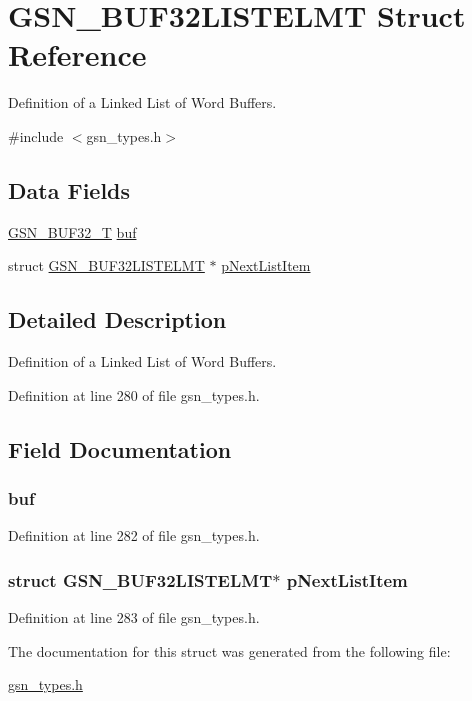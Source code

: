 \hypertarget{a00032}{
\section{GSN\_\-BUF32LISTELMT Struct Reference}
\label{a00032}
}


Definition of a Linked List of Word Buffers.  




{\ttfamily \#include $<$gsn\_\-types.h$>$}

\subsection*{Data Fields}
\begin{DoxyCompactItemize}
\item 
\hyperlink{a00031}{GSN\_\-BUF32\_\-T} \hyperlink{a00032_aa960fb6f08cc7b164d7f345f459c1b7c}{buf}
\item 
struct \hyperlink{a00032}{GSN\_\-BUF32LISTELMT} $\ast$ \hyperlink{a00032_ac045215c9122bbdf0ea59ae565237d5a}{pNextListItem}
\end{DoxyCompactItemize}


\subsection{Detailed Description}
Definition of a Linked List of Word Buffers. 

Definition at line 280 of file gsn\_\-types.h.



\subsection{Field Documentation}
\hypertarget{a00032_aa960fb6f08cc7b164d7f345f459c1b7c}{
\subsubsection[{buf}]{ {\bf buf}}}
\label{a00032_aa960fb6f08cc7b164d7f345f459c1b7c}


Definition at line 282 of file gsn\_\-types.h.

\hypertarget{a00032_ac045215c9122bbdf0ea59ae565237d5a}{
\subsubsection[{pNextListItem}]{\setlength{\rightskip}{0pt plus 5cm}struct {\bf GSN\_\-BUF32LISTELMT}$\ast$ {\bf pNextListItem}}}
\label{a00032_ac045215c9122bbdf0ea59ae565237d5a}


Definition at line 283 of file gsn\_\-types.h.



The documentation for this struct was generated from the following file:\begin{DoxyCompactItemize}
\item 
\hyperlink{a00599}{gsn\_\-types.h}\end{DoxyCompactItemize}
